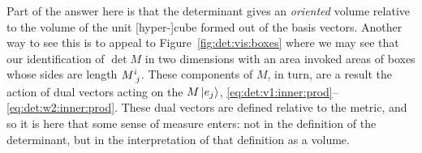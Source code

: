 \documentclass[12pt, oneside]{report}    %
\begin{document}
Part of the answer here is that the determinant gives an \emph{oriented} volume relative to the volume of the unit [hyper-]cube formed out of the basis vectors. Another way to see this is to appeal to Figure~\ref{fig:det:vis:boxes} where we may see that our identification of $\det M$ in two dimensions with an area invoked areas of boxes whose sides are length $M\aij{i}{j}$. These components of $M$, in turn, are a result the action of dual vectors acting on the $M\left|e_j\right\rangle$, \eqref{eq:det:v1:inner:prod}--\eqref{eq:det:w2:inner:prod}. These dual vectors are defined relative to the metric, and so it is here that some sense of measure enters: not in the definition of the determinant, but in the interpretation of that definition as a volume.
\end{document}
